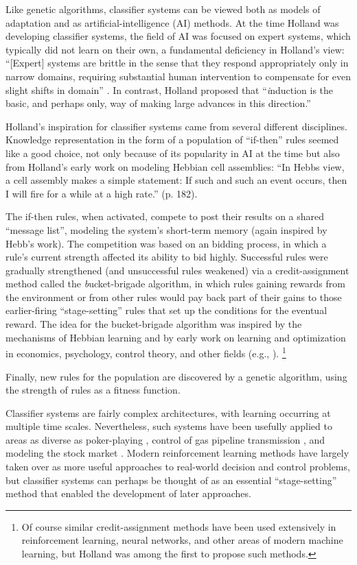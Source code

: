 \documentclass{sig-alternate}
\begin{document}
Like genetic algorithms, classifier systems can be viewed both as 
models of adaptation and as artificial-intelligence (AI) methods.  At
the time Holland was developing classifier systems, the field of AI
was focused on expert systems, which typically did not learn on their
own, a fundamental deficiency in Holland's view: ``[Expert] systems
are brittle in the sense that they respond appropriately only in
narrow domains, requiring substantial human intervention to compensate
for even slight shifts in domain'' \cite{Holland1986}. In
contrast, Holland proposed that ``{\emph induction} is the basic, and
perhaps only, way of making large advances in this direction.''

Holland's inspiration for classifier systems came from several
different disciplines.  Knowledge representation in the form of a
population of ``if-then'' rules seemed like a good choice, not only
because of its popularity in AI at the time but also from Holland's
early work on modeling Hebbian cell assemblies: ``In Hebbs view, a
cell assembly makes a simple statement: If such and such an event
occurs, then I will fire for a while at a high
rate.'' \cite{Waldrop1993} (p. 182).  

The if-then rules, when activated, compete to post their results on a
shared ``message list'', modeling the system's short-term memory
(again inspired by Hebb's work).  The competition was based on an
bidding process, in which a rule's current strength affected its
ability to bid highly.  Successful rules were gradually strengthened
(and unsuccessful rules weakened) via a credit-assignment method
called the {\emph bucket-brigade} algorithm, in which rules gaining
rewards from the environment or from other rules would pay back part
of their gains to those earlier-firing ``stage-setting'' rules that
set up the conditions for the eventual reward.  The idea for the
bucket-brigade algorithm was inspired by the mechanisms of Hebbian
learning and by early work on learning and optimization in economics,
psychology, control theory, and other fields (e.g.,
\cite{Bellman1961,Samuel1959}). \footnote{Of course similar
  credit-assignment methods have been used extensively in
  reinforcement learning, neural networks, and other areas of modern
  machine learning, but Holland was among the first to propose such
  methods.}

Finally, new rules for the population are discovered by a genetic
algorithm, using the strength of rules as a fitness function.

Classifier systems are fairly complex architectures, with learning
occurring at multiple time scales.  Nevertheless, such systems have
been usefully applied to areas as diverse as
poker-playing \cite{Smith1980}, control of gas pipeline
transmission \cite{Goldberg1983}, and modeling the stock
market \cite{Palmer1994}.  Modern reinforcement learning methods have
largely taken over as more useful approaches to real-world decision
and control problems, but classifier systems can perhaps be thought of
as an essential ``stage-setting'' method that enabled the development
of later approaches.
\end{document}
